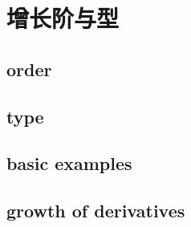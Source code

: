 \section{增长阶与型}
\label{b3:sec:1902}


\subsection{order}
\label{b3:subsec:190201}

\subsection{type}
\label{b3:subsec:190202}

\subsection{basic examples}
\label{b3:subsec:190203}

\subsection{growth of derivatives}
\label{b3:subsec:190204}


